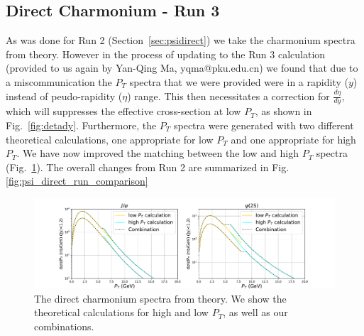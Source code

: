 \documentclass[12pt]{article}
\begin{document}
\clearpage

\subsection{Direct Charmonium - Run 3}
\label{sec:psidirect3}
As was done for Run 2 (Section~\ref{sec:psidirect}) we take the charmonium spectra from theory.  However in the process
of updating to the Run 3 calculation (provided to us again by
Yan-Qing Ma, yqma@pku.edu.cn) we found that due to a miscommunication the $P_T$ spectra that we
were provided were in a rapidity ($y$) instead of peudo-rapidity ($\eta$) range.  This then
necessitates a correction for $\frac{d\eta}{dy}$, which will suppresses the
effective cross-section at low $P_T$, as shown in Fig.~\ref{fig:detady}.
Furthermore, the $P_T$ spectra were generated with two
different theoretical calculations, one appropriate for low $P_T$ and one appropriate for high $P_T$.  We
have now improved the matching between the low and high $P_T$ spectra (Fig.~\ref{fig:psi-hi-low-match}).
The overall changes from Run 2 are summarized in Fig.\ref{fig:psi_direct_run_comparison}

\begin{figure}[H]
  \begin{center}
    \includegraphics[width=1.0\linewidth]{../oniaDirect/13p6TeV/charmonium_run3.pdf}
    \caption{\protect The direct charmonium spectra from theory.  We show the theoretical
      calculations for high and low $P_T$, as well as our combinations.}
\label{fig:psi-hi-low-match}
\end{center}
\end{figure}
\end{document}
